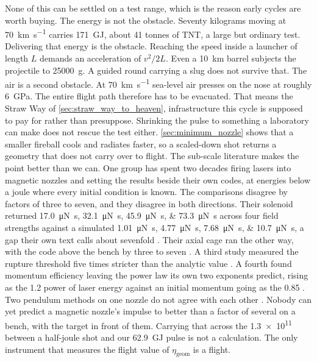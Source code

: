 \documentclass{article}
\begin{document}
None of this can be settled on a test range, which is the reason early cycles are worth buying. The energy is not the obstacle. Seventy kilograms moving at \SI{70}{\kilo\meter\per\second} carries \SI{171}{\giga\joule}, about 41 tonnes of TNT, a large but ordinary test. Delivering that energy is the obstacle. Reaching the speed inside a launcher of length $L$ demands an acceleration of $v^2/2L$. Even a \SI{10}{\kilo\meter} barrel subjects the projectile to \num{25000}~g. A guided round carrying a slug does not survive that. The air is a second obstacle. At \SI{70}{\kilo\meter\per\second} sea-level air presses on the nose at roughly \SI{6}{\giga\pascal}. The entire flight path therefore has to be evacuated. That means the Straw Way of \autoref{sec:straw_way_to_heaven}, infrastructure this cycle is supposed to pay for rather than presuppose. Shrinking the pulse to something a laboratory can make does not rescue the test either. \autoref{sec:minimum_nozzle} shows that a smaller fireball cools and radiates faster, so a scaled-down shot returns a geometry that does not carry over to flight. The sub-scale literature makes the point better than we can. One group has spent two decades firing lasers into magnetic nozzles and setting the results beside their own codes, at energies below a joule where every initial condition is known. The comparisons disagree by factors of three to seven, and they disagree in both directions. Their solenoid returned \SIlist{17.0;32.1;45.9;73.3}{\micro\newton\second} across four field strengths against a simulated \SIlist{1.01;4.77;7.68;10.7}{\micro\newton\second}, a gap their own text calls about sevenfold \cite{inatomi2023quantitative}. Their axial cage ran the other way, with the code above the bench by three to seven \cite{schilling2024subscale}. A third study measured the rupture threshold five times stricter than the analytic value \cite{kawashima2016structure}. A fourth found momentum efficiency leaving the power law its own two exponents predict, rising as the \num{1.2} power of laser energy against an initial momentum going as the \num{0.85} \cite{ogawa2026characterization}. Two pendulum methods on one nozzle do not agree with each other \cite{koba2025measurement}. Nobody can yet predict a magnetic nozzle's impulse to better than a factor of several on a bench, with the target in front of them. Carrying that across the \num{1.3e11} between a half-joule shot and our \SI{62.9}{\giga\joule} pulse is not a calculation. The only instrument that measures the flight value of $\eta_{\mathrm{geom}}$ is a flight.
\end{document}
